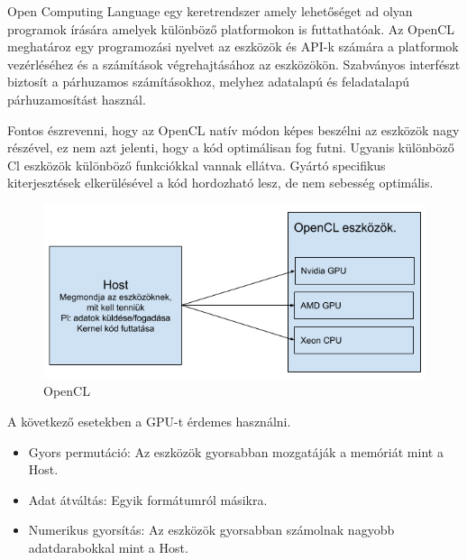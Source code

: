

Open Computing Language egy keretrendszer amely lehetőséget ad olyan programok írására amelyek különböző platformokon is futtathatóak.
Az OpenCL meghatároz egy programozási nyelvet az eszközök és API-k számára a platformok vezérléséhez és a számítások végrehajtásához az eszközökön. Szabványos interfészt biztosít a párhuzamos számításokhoz, melyhez adatalapú és feladatalapú párhuzamosítást használ.

Fontos észrevenni, hogy az OpenCL natív módon képes beszélni az eszközök nagy részével, ez nem azt jelenti, hogy a kód optimálisan fog futni. Ugyanis különböző Cl eszközök különböző funkciókkal vannak ellátva. Gyártó specifikus kiterjesztések elkerülésével a kód hordozható lesz, de nem sebesség optimális.

\begin{figure}[h!]
\centering
\includegraphics[width=\textwidth]{images/opencl.png}
\caption{OpenCL}
\label{fig:opencl}
\end{figure}

A következő esetekben a GPU-t érdemes használni.
\begin{itemize}
\item Gyors permutáció: Az eszközök gyorsabban mozgatáják a memóriát mint a Host.
\item Adat átváltás: Egyik formátumról másikra.
\item Numerikus gyorsítás: Az eszközök gyorsabban számolnak nagyobb adatdarabokkal mint a Host.
\end{itemize}
